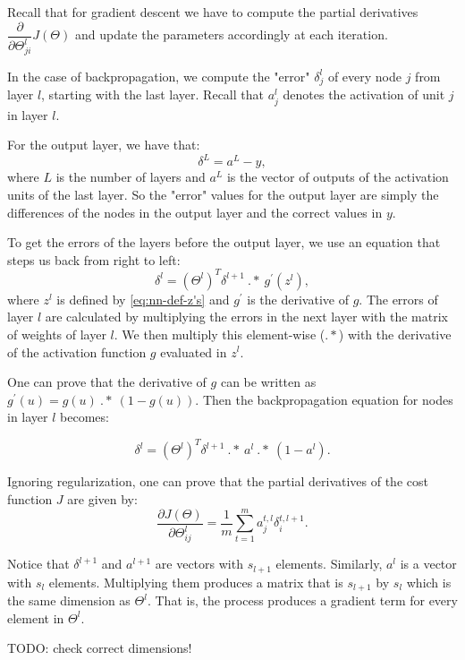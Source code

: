 \documentclass[a4paper,11pt]{report}
\begin{document}
Recall that for gradient descent we have to compute the partial derivatives $\dfrac{\partial}{\partial\Theta^l_{ji}}J(\Theta)$ and update the parameters accordingly at each iteration.

In the case of backpropagation, we compute the "error" $\delta_j^{l}$ of every node $j$ from layer $l$, starting with the last layer. Recall that $a_j^l$ denotes the activation of unit $j$ in layer $l$.

For the output layer, we have that: $$\delta^{L} = a^{L} - y,$$
where $L$ is the number of layers and $a^{L}$ is the vector of outputs of the activation units of the last layer. So the "error" values for the output layer are simply the differences of the nodes in the output layer and the correct values in $y$.

To get the errors of the layers before the output layer, we use an equation that steps us back from right to left: $$\delta^{l} = (\Theta^{l})^T \delta^{l+1}\ .*\ g^\prime(z^{l}),$$
where $z^l$ is defined by \eqref{eq:nn-def-z's} and $g^\prime$ is the derivative of $g$.
The errors of layer $l$ are calculated by multiplying the errors in the next layer with the matrix of weights of layer $l$. We then multiply this element-wise ($.*$) with the derivative of the activation function $g$ evaluated in $z^l$.

One can prove that the derivative of $g$ can be written as $g^\prime(u) = g(u)\ .*\ (1 - g(u))$. Then the backpropagation equation for nodes in layer $l$ becomes:

\begin{equation}\label{eq:nn-bkprp-eq}
\delta^{l} = (\Theta^{l})^T \delta^{l+1}\ .*\ a^{l}\ .*\ (1 - a^{l}).
\end{equation}

Ignoring regularization, one can prove that the partial derivatives of the cost function $J$ are given by:
\begin{equation}\label{eq:nn-cost-deriv}
\dfrac{\partial J(\Theta)}{\partial \Theta_{ij}^{l}} = \dfrac{1}{m}\sum_{t=1}^m a_j^{t,l} {\delta}_i^{t,l+1}.
\end{equation}

Notice that $\delta^{l+1}$  and $a^{l+1}$ are vectors with $s_{l+1}$ elements. Similarly, $a^{l}$ is a vector with $s_l$ elements. Multiplying them produces a matrix that is $s_{l+1}$ by $s_l$ which is the same dimension as $\Theta^l$. That is, the process produces a gradient term for every element in $\Theta^l$.

TODO: check correct dimensions!
\end{document}
